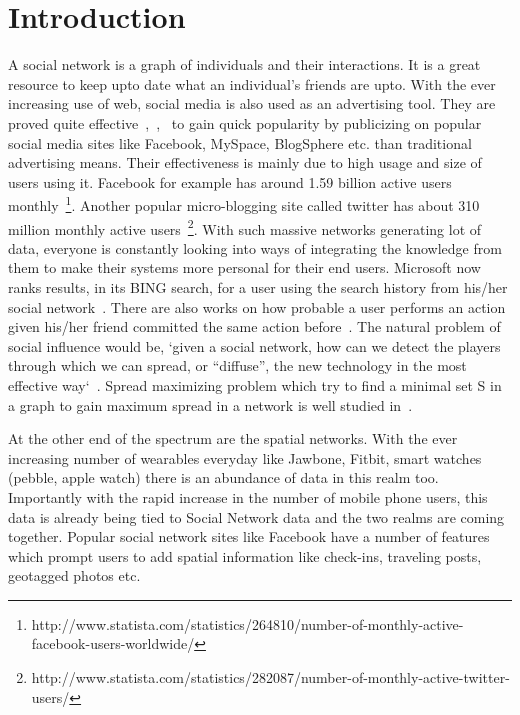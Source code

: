 \section{Introduction}
A social network is a graph of individuals and their interactions. It is a great resource to keep upto date what an individual's friends are upto. With the ever increasing use of web, social media is also used as an advertising tool. They are proved quite effective~\cite{F1969},~\cite{JP1987},~\cite{PM2001} to gain quick popularity by publicizing on popular social media sites like Facebook, MySpace, BlogSphere etc. than traditional advertising means. Their effectiveness is mainly due to high usage and size of users using it. Facebook for example has around 1.59 billion active users monthly~\footnote{http://www.statista.com/statistics/264810/number-of-monthly-active-facebook-users-worldwide/}. Another popular micro-blogging site called twitter has about 310 million monthly active users~\footnote{http://www.statista.com/statistics/282087/number-of-monthly-active-twitter-users/}. With such massive networks generating lot of data, everyone is constantly looking into ways of integrating the knowledge from them to make their systems more personal for their end users. Microsoft now ranks results, in its BING search, for a user using the search history from his/her social network~\cite{M2011}. There are also works on how probable a user performs an action given his/her friend committed the same action before~\cite{DJE2003}. The natural problem of social influence would be, `given a social network, how can we detect the players through which we can spread, or “diffuse”, the new technology in the most effective way`~\cite{EA2007}. Spread maximizing problem which try to find a minimal set S in a graph to gain maximum spread in a network is well studied in~\cite{MP2002}.

At the other end of the spectrum are the spatial networks. With the ever increasing number of wearables everyday like Jawbone, Fitbit, smart watches (pebble, apple watch) there is an abundance of data in this realm too. Importantly with the rapid increase in the number of mobile phone users, this data is already being tied to Social Network data and the two realms are coming together. Popular social network sites like Facebook have a number of features which prompt users to add spatial information like check-ins, traveling posts, geotagged photos etc.


